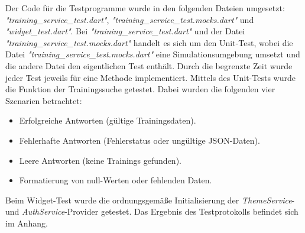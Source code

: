 Der Code für die Testprogramme wurde in den folgenden Dateien umgesetzt: \textit{"training\_service\_test.dart"},
 \textit{"training\_service\_test.mocks.dart"} und \textit{"widget\_test.dart"}.
Bei \textit{"training\_service\_test.dart"} und der Datei \textit{"training\_service\_test.mocks.dart"} handelt es sich
um den Unit-Test, wobei die Datei \textit{"training\_service\_test.mocks.dart"} eine Simulationsumgebung umsetzt und die andere Datei
 den eigentlichen Test enthält.
Durch die begrenzte Zeit wurde jeder Test jeweils für eine Methode implementiert. Mittels des Unit-Tests wurde die Funktion der
 Trainingssuche getestet. Dabei wurden die folgenden vier Szenarien betrachtet:
\begin{itemize}
    \item Erfolgreiche Antworten (gültige Trainingsdaten).
    \item Fehlerhafte Antworten (Fehlerstatus oder ungültige JSON-Daten).
    \item Leere Antworten (keine Trainings gefunden).
    \item Formatierung von null-Werten oder fehlenden Daten.
\end{itemize}

Beim Widget-Test wurde die ordnungsgemäße Initialisierung der \textit{ThemeService}- und \textit{AuthService}-Provider getestet. 
Das Ergebnis des Testprotokolls befindet sich im Anhang.
